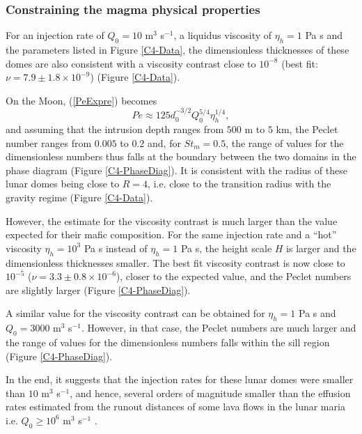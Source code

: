 \subsubsection*{Constraining the magma physical properties}
\label{C4-sec:constr-magma-phys}

For  an  injection  rate  of $Q_0=10$  m$^{3}$  s$^{-1}$,  a  liquidus
viscosity of  $\eta_h= 1$  Pa s  and the  parameters listed  in Figure
\ref{C4-Data},  the dimensionless  thicknesses of  these domes  are also
consistent with  a viscosity  contrast close  to $10^{-8}$  (best fit:
$\nu=7.9 \pm 1.8 \times 10^{-9}$) (Figure \ref{C4-Data}).  

On the Moon, (\ref{PeExpre}) becomes
\begin{equation}
  Pe \approx 125 d_0^{-3/2} Q_0^{5/4}\eta_h^{1/4},
  \label{PeExpreMoon}
\end{equation}
and assuming that  the intrusion depth ranges from $500$  m to $5$ km,
the Peclet  number ranges from  $0.005$ to $0.2$ and,  for $St_m=0.5$,
the range  of values for the  dimensionless numbers thus falls  at the
boundary  between  the  two  domains  in  the  phase  diagram  (Figure
\ref{C4-PhaseDiag}).  It is consistent with  the radius of these lunar
domes being close to $R=4$, i.e.   close to the transition radius with
the gravity regime (Figure \ref{C4-Data}).  

However, the estimate  for the viscosity contrast is  much larger than
the  value  expected  for  their  mafic  composition.   For  the  same
injection rate and  a ``hot'' viscosity $\eta_h=10^3$ Pa  s instead of
$\eta_h=1$ Pa s, the height scale  $H$ is larger and the dimensionless
thicknesses smaller.  The best  fit viscosity contrast  is now  close to
$10^{-5}$ ($\nu = 3.3 \pm  0.8 \times10^{-6}$), closer to the expected
value,   and  the   Peclet   numbers  are   slightly  larger   (Figure
\ref{C4-PhaseDiag}).  

A  similar  value for  the  viscosity  contrast  can be  obtained  for
$\eta_h=1$ Pa s and $Q_0=3000$ m$^3$ s$^{-1}$.  However, in that case,
the Peclet  numbers are much  larger and the  range of values  for the
dimensionless   numbers  falls   within   the   sill  region   (Figure
\ref{C4-PhaseDiag}).

In the end, it suggests that the injection rates for these lunar domes
were smaller than $10$ m$^{3}$  s$^{-1}$, and hence, several orders of
magnitude smaller  than the effusion  rates estimated from  the runout
distances of  some lava flows in  the lunar maria i.e.   $Q_0\ge 10^6$
m$^3$ s$^{-1}$ \citep{TracyKPGregg:1996wp}.

